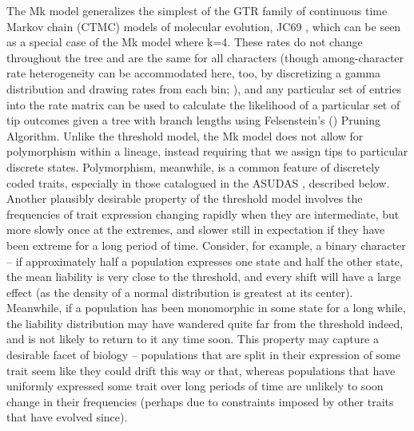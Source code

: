 The Mk model generalizes the simplest of the GTR family of continuous time Markov chain (CTMC) models of molecular evolution, JC69 \citep{jukesEvolutionProteinMolecules1969}, which can be seen as a special case of the Mk model where k=4. These rates do not change throughout the tree and are the same for all characters (though among-character rate heterogeneity can be accommodated here, too, by discretizing a gamma distribution and drawing rates from each bin; \citealt{yangMaximumLikelihoodPhylogenetic1994}), and any particular set of entries into the rate matrix can be used to calculate the likelihood of a particular set of tip outcomes given a tree with branch lengths using Felsenstein’s (\citeyear{felsensteinMaximumlikelihoodEstimationEvolutionary1973}) Pruning Algorithm. Unlike the threshold model, the Mk model does not allow for polymorphism within a lineage, instead requiring that we assign tips to particular discrete states. Polymorphism, meanwhile, is a common feature of discretely coded traits, especially in those catalogued in the ASUDAS \citep{scottAnthropologyModernHuman2018}, described below. Another plausibly desirable property of the threshold model involves the frequencies of trait expression changing rapidly when they are intermediate, but more slowly once at the extremes, and slower still in expectation if they have been extreme for a long period of time. Consider, for example, a binary character – if approximately half a population expresses one state and half the other state, the mean liability is very close to the threshold, and every shift will have a large effect (as the density of a normal distribution is greatest at its center). Meanwhile, if a population has been monomorphic in some state for a long while, the liability distribution may have wandered quite far from the threshold indeed, and is not likely to return to it any time soon. This property may capture a desirable facet of biology – populations that are split in their expression of some trait seem like they could drift this way or that, whereas populations that have uniformly expressed some trait over long periods of time are unlikely to soon change in their frequencies (perhaps due to constraints imposed by other traits that have evolved since). 

